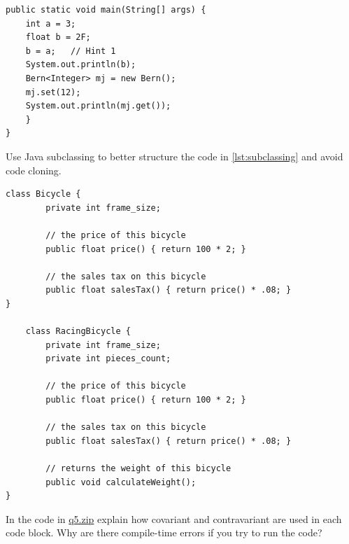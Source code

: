 \documentclass [11pt, a4wide, twoside]{article}
\begin{document}
\begin{myenumerate}
\begin{lstlisting}[float=h,style=Java,caption={Forms of polymorphism},label=lst:poly]
 public static void main(String[] args) {
 	int a = 3;
	float b = 2F;
	b = a;   // Hint 1
	System.out.println(b);
	Bern<Integer> mj = new Bern();
	mj.set(12);
	System.out.println(mj.get());
	}
}
\end{lstlisting}

\solution{}

\item Use Java subclassing to better structure the code in \autoref{lst:subclassing} and avoid code cloning.

\begin{lstlisting}[float=t,style=Java,caption={Subclassing},label=lst:subclassing]
	class Bicycle {
		private int frame_size;
		
		// the price of this bicycle
		public float price() { return 100 * 2; }

		// the sales tax on this bicycle
		public float salesTax() { return price() * .08; }
}

	class RacingBicycle {
		private int frame_size;
		private int pieces_count;

		// the price of this bicycle
		public float price() { return 100 * 2; }

		// the sales tax on this bicycle
		public float salesTax() { return price() * .08; }

		// returns the weight of this bicycle
		public void calculateWeight();
}
\end{lstlisting}

\solution{}

\item In the code in \href{http://scg.unibe.ch/download/lectures/pl2018-exercises/q5.zip}{q5.zip} explain how covariant and contravariant are used in each code block. Why are there compile-time errors if you try to run the code?
\end{myenumerate}

\solution{}
\end{document}
